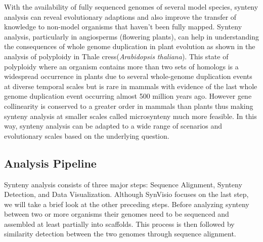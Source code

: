 With the availability of fully sequenced genomes of several model species, synteny analysis can reveal evolutionary adaptions and also improve the transfer of knowledge to non-model organisms that haven't been fully mapped\cite{zhao2019network}. Synteny analysis, particularly in angiosperms (flowering plants), can help in understanding the consequences of whole genome duplication in plant evolution\cite{adams2005polyploidy} as shown in the analysis of polyploidy in Thale cress(\textit{Arabidopsis thaliana})\cite{seoighe2003turning}. This state of polyploidy where an organism contains more than two sets of homologs is a widespread occurrence in plants  due to several whole-genome duplication events at diverse temporal scales but is rare in mammals with evidence of the last whole genome duplication event occurring almost 500 million years ago\cite{adams2005polyploidy,panopoulou2005timing}. However gene collinearity is conserved to a greater order in mammals than plants thus making synteny analysis at smaller scales called microsynteny much more feasible\cite{zhao2019network}. In this way, synteny analysis can be adapted to a wide range of scenarios and evolutionary scales based on the underlying question.

\subsection{Analysis Pipeline}

Synteny analysis consists of three major steps: Sequence Alignment, Synteny Detection, and Data Visualization. Although SynVisio focuses on the last step, we will take a brief look at the other preceding steps. Before analyzing synteny between two or more organisms their genomes need to be sequenced and assembled at least partially into scaffolds. This process is then followed by similarity detection between the two genomes through sequence alignment.



